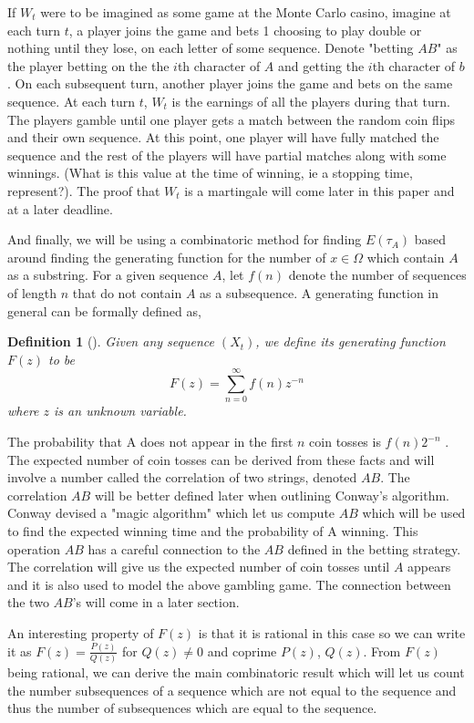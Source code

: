 \documentclass{article}
\newtheorem{definition}[theorem]{Definition}
\numberwithin{mytheorem}{subsection} %
\begin{document}
	    If $W_t$ were to be imagined as some game at the Monte Carlo casino, imagine at each turn $t$, a player joins the game and bets 1 choosing to play double or nothing until they lose, on each letter of some sequence. Denote "betting $AB$" as the player betting on the the $i$th character of $A$ and getting the $i$th character of $b$. On each subsequent turn, another player joins the game and bets on the same sequence. At each turn $t$, $W_t$ is the earnings of all the players during that turn. The players gamble until one player gets a match between the random coin flips and their own sequence. At this point, one player will have fully matched the sequence and the rest of the players will have partial matches along with some winnings. (What is this value at the time of winning, ie a stopping time, represent?). The proof that $W_t$ is a martingale will come later in this paper and at a later deadline. 

		And finally, we will be using a combinatoric method for finding $E(\tau_A)$ based around finding the generating function for the number of $x \in \Omega$ which contain $A$ as a substring. For a given sequence $A$, let $f(n)$ denote the number of sequences of length $n$ that do not contain $A$ as a subsequence. A generating function in general can be formally defined as,
		\begin{definition}[\cite{enumerate}]
			Given any sequence $(X_t)$, we define its generating function $F(z)$ to be
			$$F(z) = \sum_{n=0}^\infty f(n) z^{-n}$$
			where $z$ is an unknown variable.
		\end{definition}

		The probability that A does not appear in the first $n$ coin tosses is $f(n)2^{-n}$ \cite{enumerate}. The expected number of coin tosses can be derived from these facts and will involve a number called the correlation of two strings, denoted $AB$. The correlation $AB$ will be better defined later when outlining Conway's algorithm. Conway devised a "magic algorithm" which let us compute $AB$ which will be used to find the expected winning time and the probability of A winning. This operation $AB$ has a careful connection to the $AB$ defined in the betting strategy. The correlation will give us the expected number of coin tosses until $A$ appears and it is also used to model the above gambling game. The connection between the two $AB$'s will come in a later section.

		An interesting property of $F(z)$ is that it is rational in this case so we can write it as $F(z) = \frac{P(z)}{Q(z)}$ for $Q(z) \neq 0$ and coprime $P(z)$, $Q(z)$. From $F(z)$ being rational, we can derive the main combinatoric result which will let us count the number subsequences of a sequence which are not equal to the sequence and thus the number of subsequences which are equal to the sequence.
\end{document}
